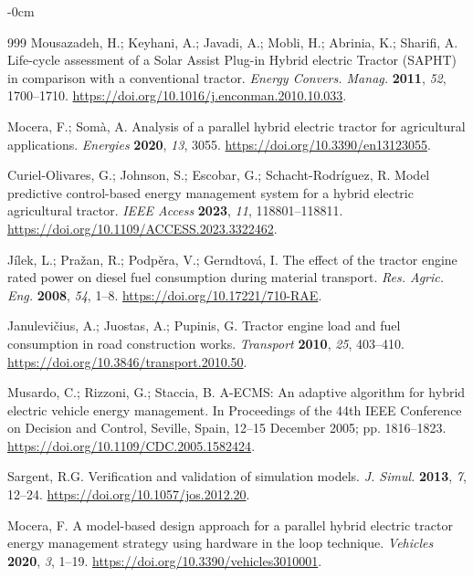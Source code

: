 \documentclass[energies,article,submit,moreauthors]{Definitions/mdpi}
\begin{document}
\begin{adjustwidth}{-\extralength}{0cm}


\begin{thebibliography}{999}
 Mousazadeh, H.; Keyhani, A.; Javadi, A.; Mobli, H.; Abrinia, K.; Sharifi, A. Life-cycle assessment of a Solar Assist Plug-in Hybrid electric Tractor (SAPHT) in comparison with a conventional tractor. \emph{Energy Convers. Manag.} \textbf{2011}, \emph{52}, 1700--1710. \url{https://doi.org/10.1016/j.enconman.2010.10.033}.

 Mocera, F.; Som\`a, A. Analysis of a parallel hybrid electric tractor for agricultural applications. \emph{Energies} \textbf{2020}, \emph{13}, 3055. \url{https://doi.org/10.3390/en13123055}.

 Curiel-Olivares, G.; Johnson, S.; Escobar, G.; Schacht-Rodr\'iguez, R. Model predictive control-based energy management system for a hybrid electric agricultural tractor. \emph{IEEE Access} \textbf{2023}, \emph{11}, 118801--118811. \url{https://doi.org/10.1109/ACCESS.2023.3322462}.

 J\'ilek, L.; Pra\v{z}an, R.; Podp\v{e}ra, V.; Gerndtov\'a, I. The effect of the tractor engine rated power on diesel fuel consumption during material transport. \emph{Res. Agric. Eng.} \textbf{2008}, \emph{54}, 1--8. \url{https://doi.org/10.17221/710-RAE}.

 Janulevi\v{c}ius, A.; Juostas, A.; Pupinis, G. Tractor engine load and fuel consumption in road construction works. \emph{Transport} \textbf{2010}, \emph{25}, 403--410. \url{https://doi.org/10.3846/transport.2010.50}.

 Musardo, C.; Rizzoni, G.; Staccia, B. A-ECMS: An adaptive algorithm for hybrid electric vehicle energy management. {In Proceedings of the 44th IEEE Conference on Decision and Control}, Seville, Spain, 12--15 December 2005; pp. 1816--1823. \url{https://doi.org/10.1109/CDC.2005.1582424}.

 Sargent, R.G. Verification and validation of simulation models. \emph{J. Simul.} \textbf{2013}, \emph{7}, 12--24. \url{https://doi.org/10.1057/jos.2012.20}.

 Mocera, F. A model-based design approach for a parallel hybrid electric tractor energy management strategy using hardware in the loop technique. \emph{Vehicles} \textbf{2020}, \emph{3}, 1--19. \url{https://doi.org/10.3390/vehicles3010001}.


\end{thebibliography}
\end{adjustwidth}
\end{document}
